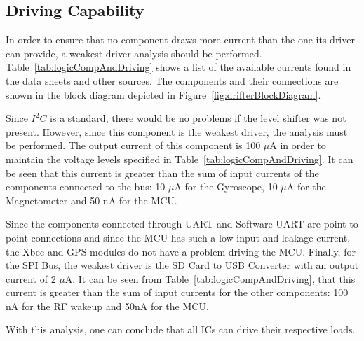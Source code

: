 \subsection{Driving Capability}

In order to ensure that no component draws more current than the one its driver can provide, a weakest driver analysis should be performed. Table~\ref{tab:logicCompAndDriving} shows a list of the available currents found in the data sheets and other sources. The components and their connections are shown in the block diagram depicted in Figure~\ref{fig:drifterBlockDiagram}.

Since $I^2C$ is a standard, there would be no problems if the level shifter was not present.  However, since this component is the weakest driver, the analysis must be performed.  The output current of this component is 100 $\mu$A in order to maintain the voltage levels specified in Table~\ref{tab:logicCompAndDriving}.  It can be seen that this current is greater than the sum of input currents of the components connected to the bus: 10 $\mu$A for the Gyroscope, 10 $\mu$A for the Magnetometer and 50 nA for the MCU.

Since the components connected through UART and Software UART are point to point connections and since the MCU has such a low input and leakage current, the Xbee and GPS modules do not have a problem driving the MCU.  Finally, for the SPI Bus, the weakest driver is the SD Card to USB Converter with an output current of 2 $\mu$A.  It can be seen from Table~\ref{tab:logicCompAndDriving}, that this current is greater than the sum of input currents for the other components: 100 nA for the RF wakeup and 50nA for the MCU.

With this analysis, one can conclude that all ICs can drive their respective loads.

